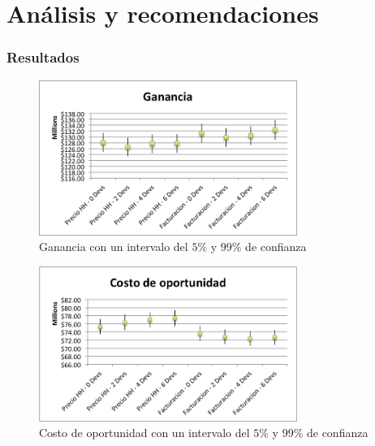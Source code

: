 \part*{Análisis y recomendaciones}

\section{Resultados}


\begin{figure}[H]

\begin{center}
    \includegraphics[width=0.75\textwidth,height=0.75\textheight,keepaspectratio]{./images/objective-earnings.png}
\end{center}

\label{fig:objective-earnings}
\caption{Ganancia con un intervalo del $5\%$ y $99\%$ de confianza}

\end{figure}

\begin{figure}[H]

\begin{center}
    \includegraphics[width=0.75\textwidth,height=0.75\textheight,keepaspectratio]{./images/objective-cost.png}
\end{center}

\label{fig:objective-cost}
\caption{Costo de oportunidad con un intervalo del $5\%$ y $99\%$ de confianza}

\end{figure}

